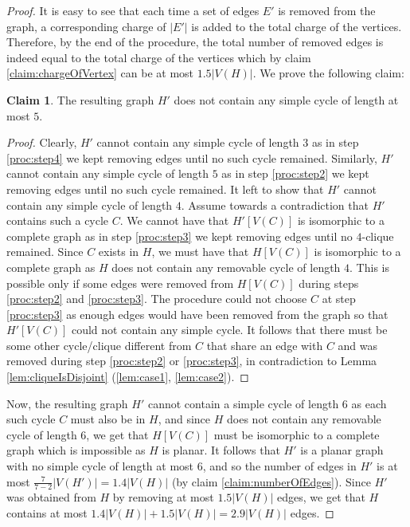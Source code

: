 \documentclass{article}
\theoremstyle{definition}
\newtheorem{claim}{Claim}[section]
\begin{document}
\begin{proof}
It is easy to see that each time a set of edges $E'$ is removed from the graph, a corresponding charge of $|E'|$ is added to the total charge of the vertices. Therefore, by the end of the procedure, the total number of removed edges is indeed equal to the total charge of the vertices which by claim \ref{claim:chargeOfVertex} can be at most $1.5|V(H)|$. We prove the following claim:

\begin{claim} The resulting graph $H'$ does not contain any simple cycle of length at most $5$.\label{claim:noShortCycles}\end{claim}

\begin{proof} Clearly, $H'$ cannot contain any simple cycle of length $3$ as in step \ref{proc:step4} we kept removing edges until no such cycle remained. Similarly, $H'$ cannot contain any simple cycle of length $5$ as in step \ref{proc:step2} we kept removing edges until no such cycle remained. It left to show that $H'$ cannot contain any simple cycle of length $4$. Assume towards a contradiction that $H'$ contains such a cycle $C$. We cannot have that $H'[V(C)]$ is isomorphic to a complete graph as in step \ref{proc:step3} we kept removing edges until no $4$-clique remained. Since $C$ exists in $H$, we must have that $H[V(C)]$ is isomorphic to a complete graph as $H$ does not contain any removable cycle of length $4$. This is possible only if some edges were removed from $H[V(C)]$ during steps \ref{proc:step2} and \ref{proc:step3}. The procedure could not choose $C$ at step \ref{proc:step3} as enough edges would have been removed from the graph so that $H'[V(C)]$ could not contain any simple cycle. It follows that there must be some other cycle/clique different from $C$ that share an edge with $C$ and was removed during step \ref{proc:step2} or \ref{proc:step3}, in contradiction to Lemma \ref{lem:cliqueIsDisjoint} (\ref{lem:case1}, \ref{lem:case2}).\end{proof}

Now, the resulting graph $H'$ cannot contain a simple cycle of length $6$ as each such cycle $C$ must also be in $H$, and since $H$ does not contain any removable cycle of length $6$, we get that $H[V(C)]$ must be isomorphic to a complete graph which is impossible as $H$ is planar. It follows that $H'$ is a planar graph with no simple cycle of length at most $6$, and so the number of edges in $H'$ is at most $\frac{7}{7-2}|V(H')| = 1.4|V(H)|$ (by claim \ref{claim:numberOfEdges}). Since $H'$ was obtained from $H$ by removing at most $1.5|V(H)|$ edges, we get that $H$ contains at most $1.4|V(H)| + 1.5|V(H)| = 2.9|V(H)|$ edges.\end{proof}
\end{document}

